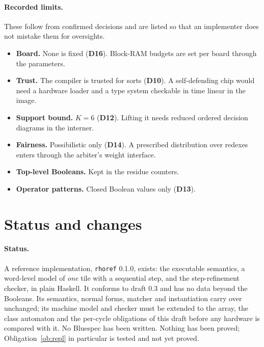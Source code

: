 \documentclass[11pt]{article}
\newcommand{\kw}[1]{\texttt{#1}}
\newcommand{\dec}[1]{\textbf{D#1}}
\theoremstyle{definition}
\theoremstyle{remark}
\begin{document}
\paragraph{Recorded limits.} These follow from confirmed decisions and are
listed so that an implementer does not mistake them for oversights.
\begin{itemize}
\item \textbf{Board.} None is fixed (\dec{16}). Block-RAM budgets are set per
board through the parameters.
\item \textbf{Trust.} The compiler is trusted for sorts (\dec{10}). A
self-defending chip would need a hardware loader and a type system checkable
in time linear in the image.
\item \textbf{Support bound.} $K=6$ (\dec{12}). Lifting it needs reduced
ordered decision diagrams in the interner.
\item \textbf{Fairness.} Possibilistic only (\dec{14}). A prescribed
distribution over redexes enters through the arbiter's weight interface.
\item \textbf{Top-level Booleans.} Kept in the residue counters.
\item \textbf{Operator patterns.} Closed Boolean values only (\dec{13}).
\end{itemize}

\section{Status and changes}\label{sec:changes}

\paragraph{Status.} A reference implementation, \kw{rhoref} 0.1.0, exists:
the executable semantics, a word-level model of \emph{one} tile with a
sequential step, and the step-refinement checker, in plain Haskell. It
conforms to draft 0.3 and has no data beyond the Booleans. Its semantics, normal forms, matcher and
instantiation carry over unchanged; its machine model and checker must be
extended to the array, the class automaton and the per-cycle obligations of
this draft before any hardware is compared with it. No Bluespec has been
written. Nothing has been proved; Obligation~\ref{ob:repl} in particular is
tested and not yet proved.
\end{document}
